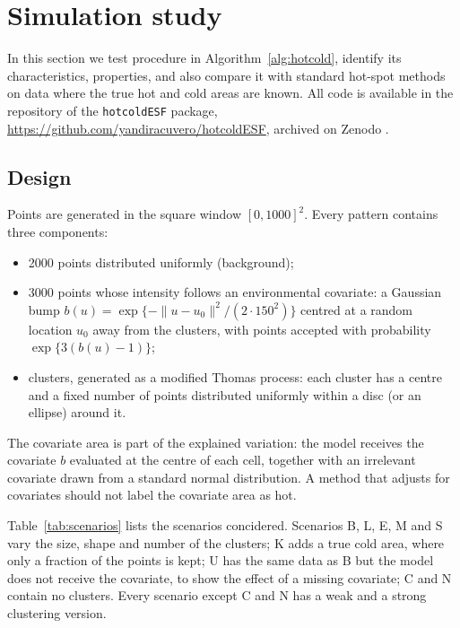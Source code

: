 \section{Simulation study}\label{sec:sim}

In this section we test procedure in Algorithm~\ref{alg:hotcold}, identify its characteristics, properties, and also compare it  with standard hot-spot methods on data where the true hot and cold areas are known. All code is available in the repository of the \texttt{hotcoldESF} package, \url{https://github.com/yandiracuvero/hotcoldESF}, archived on Zenodo \citep{hotcoldesf2026}. 

\subsection{Design}\label{sec:sim-design}

 Points are generated in the square window $[0,1000]^2$. Every pattern contains three components:
\begin{itemize}
  \item 2000 points distributed uniformly (background);
  \item 3000 points whose intensity follows an environmental covariate: a Gaussian bump $b(u)=\exp\{-\lVert u-u_0\rVert^2/(2\cdot150^2)\}$ centred at a random location $u_0$ away from the clusters, with points accepted with probability $\exp\{3(b(u)-1)\}$;
  \item clusters, generated as a modified Thomas process: each cluster has a centre and a fixed number of points distributed uniformly within a disc (or an ellipse) around it.
\end{itemize}
The covariate area is part of the explained variation: the model receives the covariate $b$ evaluated at the centre of each cell, together with an irrelevant covariate drawn from a standard normal distribution. A method that adjusts for covariates should not label the covariate area as hot.

Table~\ref{tab:scenarios} lists the scenarios concidered. Scenarios B, L, E, M and S vary the size, shape and number of the clusters; K adds a true cold area, where only a fraction of the points is kept; U has the same data as B but the model does not receive the covariate, to show the effect of a missing covariate; C and N contain no clusters. Every scenario except C and N has a weak and a strong clustering version.

